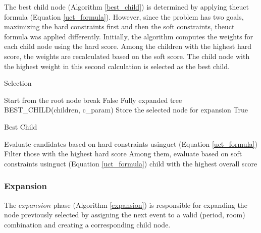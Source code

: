 The best child node (Algorithm \ref{best_child}) is determined by applying the\ac{uct} formula (Equation \ref{uct_formula}). However, since the problem has two goals, maximizing the hard constraints first and then the soft constraints, the\ac{uct} formula was applied differently. Initially, the algorithm computes the weights for each child node using the hard score. Among the children with the highest hard score, the weights are recalculated based on the soft score. The child node with the highest weight in this second calculation is selected as the best child. %

\begin{algorithm}
\caption{Selection}\label{selection}
\begin{algorithmic}[1]
	\State Start from the root node
				\State break
			\Else
					\State \Return False \Comment Fully expanded tree
            			\Else
                			\State BEST\_CHILD(children, c\_param)
				\EndIf
			\EndIf
	\EndWhile
	\State Store the selected node for expansion
	\State \Return True
\EndFunction
\end{algorithmic}
\end{algorithm}


\begin{algorithm}
\caption{Best Child}\label{best_child}
\begin{algorithmic}[1]
    \State Evaluate candidates based on hard constraints using\ac{uct} (Equation \ref{uct_formula})
    \State Filter those with the highest hard score
    \State Among them, evaluate based on soft constraints using\ac{uct} (Equation \ref{uct_formula})
    \State \Return child with the highest overall score
\EndFunction
\end{algorithmic}
\end{algorithm}

\subsubsection{Expansion}

The \(expansion\) phase (Algorithm \ref{expansion}) is responsible for expanding the node previously selected by assigning the next event to a valid (period, room) combination and creating a corresponding child node.

